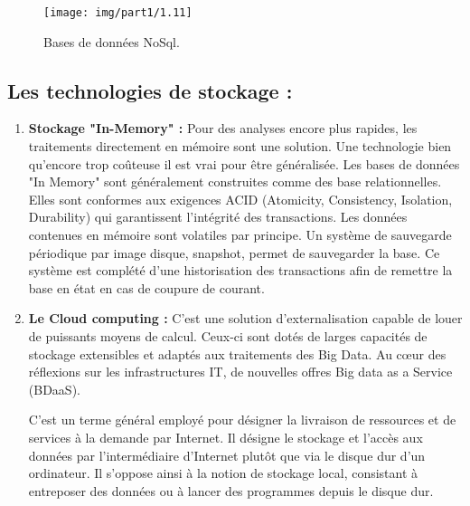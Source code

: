 \begin{enumerate}[label=\protect\ding{\value*}, start=182,font=\color{blue}]
\begin{figure}[h]
	\centering
	\texttt{[image: img/part1/1.11]}
	\caption{Bases de données NoSql.}
\end{figure}

\end{enumerate}

\subsection{Les technologies de stockage :}
\begin{enumerate}
\item  \textbf{Stockage "In-Memory" :}
Pour des analyses encore plus rapides, les traitements directement en mémoire sont une solution. Une technologie bien qu'encore trop coûteuse il est vrai pour être généralisée. Les bases de données "In Memory" sont généralement construites comme des base relationnelles. Elles sont conformes aux exigences ACID (Atomicity, Consistency, Isolation, Durability) qui garantissent l'intégrité des transactions. Les données contenues en mémoire sont volatiles par principe. Un système de sauvegarde périodique par image disque, snapshot, permet de sauvegarder la base. Ce système est complété d'une historisation des transactions afin de remettre la base en état en cas de coupure de courant.

\item \textbf{Le Cloud computing :}
C’est une solution d'externalisation capable de louer de puissants moyens de calcul. Ceux-ci sont dotés de larges capacités de stockage extensibles et adaptés aux traitements des Big Data. Au cœur des réflexions sur les infrastructures IT, de nouvelles offres Big data as a Service (BDaaS).

C'est un terme général employé pour désigner la livraison de ressources et de services à la demande par Internet. Il désigne le stockage et l'accès aux données par l'intermédiaire d'Internet plutôt que via le disque dur d'un ordinateur. Il s'oppose ainsi à la notion de stockage local, consistant à entreposer des données ou à lancer des programmes depuis le disque dur.

\end{enumerate}



